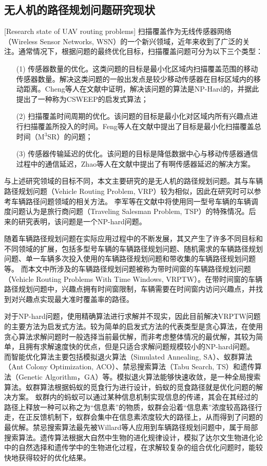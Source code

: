 \subsection{无人机的路径规划问题研究现状}[Research state of UAV routing problems]
扫描覆盖作为无线传感器网络（Wireless Sensor Networks, WSN）的一个新兴领域，近年来收到了广泛的关注。通常情况下，根据问题的最终优化目标，扫描覆盖问题可分为以下三个类型：
\begin{itemize}
  \item [(1)] 传感器数量的优化。这类问题的目标是最小化区域内扫描覆盖范围的移动传感器数量。解决这类问题的一般出发点是较少移动传感器在目标区域内的移动距离。Cheng等人在文献中证明，解决该问题的算法是NP-Hard的，并据此提出了一种称为CSWEEP的启发式算法；
  \item [(2)] 扫描覆盖时间周期的优化。该问题的目标是最小化对区域内所有兴趣点进行扫描覆盖所投入的时间。Feng等人在文献中提出了目标是最小化扫描覆盖总时间（M$^3$SR）的问题；
  \item [(3)] 传感器传输延迟的优化。该问题的目标是降低数据中心与移动传感器通信过程中的通信延迟，Zhao等人在文献中提出了有啊传感器延迟的解决方案。
\end{itemize}


与上述研究领域的目标不同，本文主要研究的是无人机的路径规划问题。其与车辆路径规划问题（Vehicle Routing Problem, VRP）较为相似，因此在研究时可以参考车辆路径问题领域的相关方法。
李军等在文献中将使用同一型号车辆的车辆调度问题认为是旅行商问题（Traveling Salesman Problem, TSP）的特殊情况。后来的研究表明，该问题是一个NP-hard问题。


随着车辆路径规划问题在实际应用过程中的不断发展，其又产生了许多不同目标和不同领域的扩展，包括多型号车辆的车辆路径规划问题、随机需求的车辆路径规划问题、单一车辆多次投入使用的车辆路径规划问题和带收集的车辆路径规划问题等。
而本文中所涉及的车辆路径规划问题被称为带时间窗的车辆路径规划问题（Vehicle Routing Problems With Time Windows, VRPTW）。在带时间窗的车辆路径规划问题中，兴趣点拥有时间窗限制，车辆需要在时间窗内访问兴趣点，并找到对兴趣点实现最大准时覆盖率的路径。


对于NP-hard问题，使用精确算法进行求解并不现实，因此目前解决VRPTW问题的主要方法为启发式方法。较为简单的启发式方法的代表类型是贪心算法，在使用贪心算法求解问题时一般选择当前最优解，而非考虑整体情况的最优解，其较为简单，且拥有求解速度快的优点，但是只适合求解问题规模较小的NP-hard问题。
而智能优化算法主要包括模拟退火算法（Simulated Annealing, SA）、蚁群算法（Ant Colony Optimization, ACO）、禁忌搜索算法（Tabu Search, TS）和遗传算法（Genetic Algorithm，GA）等。模拟退火算法能够快速收敛，是一种全局搜索算法。蚁群算法根据蚂蚁的觅食行为进行设计，蚂蚁的觅食路径就是优化问题的解决方案。
蚁群内的蚂蚁可以通过某种信息机制实现信息的传递，其会在其经过的路径上释放一种可以称之为“信息素”的物质，蚁群会沿着“信息素”浓度较高路径行走，在正反馈机制下，蚁群会集中在信息素浓度较大的路径上，从而得到了问题的最优解。禁忌搜索算法最先被Willard等人应用到车辆路径规划问题中，属于局部搜索算法。遗传算法根据大自然中生物的进化规律设计，模拟了达尔文生物进化论中的自然选择和遗传学中的生物进化过程，在求解较复杂的组合优化问题时，能较快地获得较好的优化结果。


